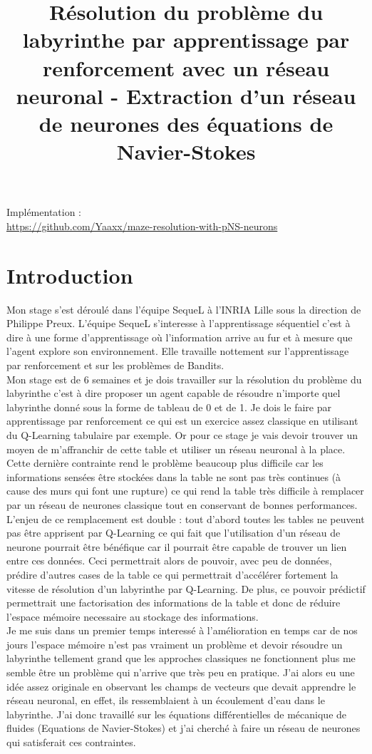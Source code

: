 \documentclass[12pt]{article}
\title{Résolution du problème du labyrinthe par apprentissage par renforcement avec un réseau neuronal - Extraction d'un réseau de neurones des équations de Navier-Stokes}
\begin{document}
\maketitle

Implémentation : \\
\url{https://github.com/Yaaxx/maze-resolution-with-pNS-neurons}


\section{Introduction}
Mon stage s'est déroulé dans l'équipe SequeL à l'INRIA Lille sous la direction de Philippe Preux. L'équipe SequeL s'interesse à l'apprentissage séquentiel c'est à dire à une forme d'apprentissage où l'information arrive au fur et à mesure que l'agent explore son environnement. Elle travaille nottement sur l'apprentissage par renforcement et sur les problèmes de Bandits.\\
Mon stage est de 6 semaines et je dois travailler sur la résolution du problème du labyrinthe c'est à dire proposer un agent capable de résoudre n'importe quel labyrinthe donné sous la forme de tableau de 0 et de 1. Je dois le faire par apprentissage par renforcement ce qui est un exercice assez classique en utilisant du Q-Learning tabulaire par exemple. Or pour ce stage je vais devoir trouver un moyen de m'affranchir de cette table et utiliser un réseau neuronal à la place. Cette dernière contrainte rend le problème beaucoup plus difficile car les informations sensées être stockées dans la table ne sont pas très continues (à cause des murs qui font une rupture) ce qui rend la table très difficile à remplacer par un réseau de neurones classique tout en conservant de bonnes performances.
L'enjeu de ce remplacement est double : tout d'abord toutes les tables ne peuvent pas être apprisent par Q-Learning ce qui fait que l'utilisation d'un réseau de neurone pourrait être bénéfique car il pourrait être capable de trouver un lien entre ces données. Ceci permettrait alors de pouvoir, avec peu de données, prédire d'autres cases de la table ce qui permettrait d'accélérer fortement la vitesse de résolution d'un labyrinthe par Q-Learning. De plus, ce pouvoir prédictif permettrait une factorisation des informations de la table et donc de réduire l'espace mémoire necessaire au stockage des informations.\\
Je me suis dans un premier temps interessé à l'amélioration en temps car de nos jours l'espace mémoire n'est pas vraiment un problème et devoir résoudre un labyrinthe tellement grand que les approches classiques ne fonctionnent plus me semble être un problème qui n'arrive que très peu en pratique. J'ai alors eu une idée assez originale en observant les champs de vecteurs que devait apprendre le réseau neuronal, en effet, ils ressemblaient à un écoulement d'eau dans le labyrinthe. J'ai donc travaillé sur les équations différentielles de mécanique de fluides (Equations de Navier-Stokes) et j'ai cherché à faire un réseau de neurones qui satisferait ces contraintes.\\
\end{document}
